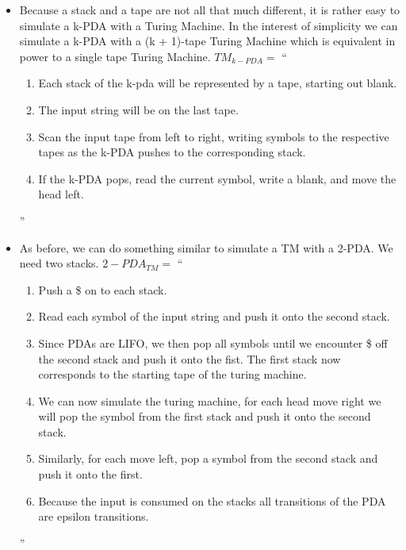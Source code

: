 \begin{problem}{5}
  \begin{solution}
    \begin{itemize}
      \item Because a stack and a tape are not all that much different, it is rather easy to simulate a k-PDA with a
      Turing Machine.  In the interest of simplicity we can simulate a k-PDA with a (k + 1)-tape Turing Machine which is
      equivalent in power to a single tape Turing Machine.
      $TM_{k-PDA} = $ ``
      \begin{enumerate}
        \item Each stack of the k-pda will be represented by a tape, starting out blank. \\
        \item The input string will be on the last tape. \\
        \item Scan the input tape from left to right, writing symbols to the respective tapes as the k-PDA pushes to the corresponding stack. \\
        \item If the k-PDA pops, read the current symbol, write a blank, and move the head left.
      \end{enumerate}
      '' \\
      \item As before, we can do something similar to simulate a TM with a 2-PDA. We need two stacks.
      $2-PDA_{TM} =$ ``
        \begin{enumerate}
          \item Push a \$ on to each stack. \\
          \item Read each symbol of the input string and push it onto the second stack. \\
          \item Since PDAs are LIFO, we then pop all symbols until we encounter \$ off the second stack and push it onto the fist.  The first stack now corresponds to the starting tape of the turing machine. \\
          \item We can now simulate the turing machine, for each head move right we will pop the symbol from the first stack and push it onto the second stack. \\
          \item Similarly, for each move left, pop a symbol from the second stack and push it onto the first. \\
          \item Because the input is consumed on the stacks all transitions of the PDA are epsilon transitions.
        \end{enumerate}
      ''
    \end{itemize}
  \end{solution}
\end{problem}


